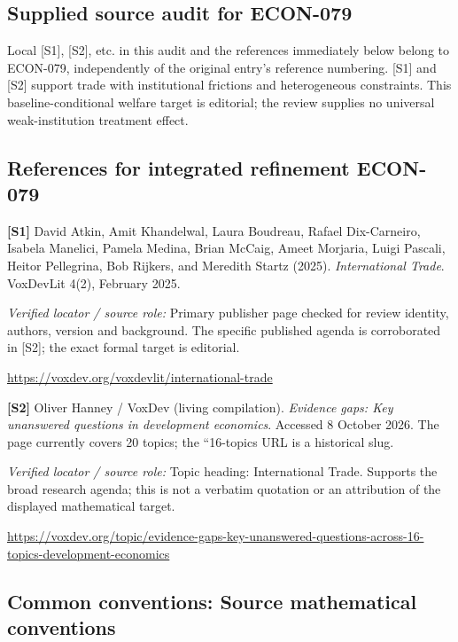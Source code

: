 \documentclass[11pt,a4paper]{article}
\begin{document}
\subsection*{Supplied source audit for ECON-079}
Local [S1], [S2], etc. in this audit and the references immediately below
belong to ECON-079, independently of the original entry's reference numbering.
[S1] and [S2] support trade with institutional frictions and heterogeneous constraints. This baseline-conditional welfare target is editorial; the review supplies no universal weak-institution treatment effect.
\subsection*{References for integrated refinement ECON-079}
{\footnotesize\raggedright
\par\noindent\textbf{[S1]} David Atkin, Amit Khandelwal, Laura Boudreau, Rafael Dix-Carneiro, Isabela Manelici, Pamela Medina, Brian McCaig, Ameet Morjaria, Luigi Pascali, Heitor Pellegrina, Bob Rijkers, and Meredith Startz (2025). \emph{International Trade}. VoxDevLit 4(2), February 2025.\par \textit{Verified locator / source role:} Primary publisher page checked for review identity, authors, version and background. The specific published agenda is corroborated in [S2]; the exact formal target is editorial.\par \url{https://voxdev.org/voxdevlit/international-trade}\par\smallskip
\par\noindent\textbf{[S2]} Oliver Hanney / VoxDev (living compilation). \emph{Evidence gaps: Key unanswered questions in development economics}. Accessed 8 October 2026. The page currently covers 20 topics; the ``16-topics URL is a historical slug.\par \textit{Verified locator / source role:} Topic heading: International Trade. Supports the broad research agenda; this is not a verbatim quotation or an attribution of the displayed mathematical target.\par \url{https://voxdev.org/topic/evidence-gaps-key-unanswered-questions-across-16-topics-development-economics}\par\smallskip
}

\subsection*{Common conventions: Source mathematical conventions}
\end{document}
